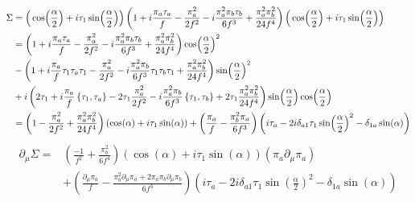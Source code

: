 \documentclass{article}
\begin{document}
\begin{align*}
    \Sigma & =  \Big( \cos(\frac{\alpha}{2}) + i \tau_1 \sin(\frac{\alpha}{2}) \Big) 
    \left(
        1
        + i \frac{\pi_a \tau_a}{f} 
        - \frac{\pi_a^2}{2f^2}
        - i \frac{\pi_a^2\pi_b \tau_b}{6f^3}
        + \frac{\pi_a^2\pi_b^2}{24f^4}    
    \right)
    \Big( \cos(\frac{\alpha}{2}) + i \tau_1 \sin(\frac{\alpha}{2}) \Big) \\
    & =
    \left(
        1
        + i \frac{\pi_a \tau_a}{f} 
        - \frac{\pi_a^2}{2f^2}
        - i \frac{\pi_a^2\pi_b \tau_b}{6f^3}
        + \frac{\pi_a^2\pi_b^2}{24f^4}    
    \right)
    \cos(\frac{\alpha}{2})^2 \\
    & -
    \left(
        1 
        + i \frac{\pi_a}{f} \tau_1\tau_a\tau_1
        - \frac{\pi_a^2}{2f^2}
        - i \frac{\pi_a^2\pi_b}{6f^3} \tau_1\tau_b\tau_1
        + \frac{\pi_a^2\pi_b^2}{24f^4}
    \right)
    \sin(\frac{\alpha}{2})^2\\
    & + i
    \left(
        2 \tau_1
        + i \frac{\pi_a}{f} \left\{\tau_1, \tau_a \right\}
        - 2\tau_1 \frac{\pi_a^2}{2f^2}
        - i \frac{\pi_a^2\pi_b}{6f^3} \left\{\tau_1, \tau_b \right\}
        + 2\tau_1 \frac{\pi_a^2\pi_b^2}{24f^4}
    \right)
    \sin(\frac{\alpha}{2})\cos(\frac{\alpha}{2}) \\
    &= \left(
        1 
        - \frac{\pi_a^2}{2f^2}
        + \frac{\pi_a^2\pi_b^2}{24f^4}
    \right)
    (\cos(\alpha) + i \tau_1 \sin(\alpha))
    + 
    \left(
        \frac{\pi_a}{f} 
        - \frac{\pi_b^2\pi_a}{6f^3} 
    \right)
    \left(
        i\tau_a - 2i \delta_{a1}\tau_1\sin(\frac{\alpha}{2})^2 - \delta_{1a} \sin(\alpha)
    \right)
\end{align*}
\begin{align*}
    \partial_\mu \Sigma = &
    \left(
        \frac{-1}{f^2}
        + \frac{\pi_b^2}{6f^4}
    \right)
    (\cos(\alpha) + i \tau_1 \sin(\alpha)) (\pi_a \partial_\mu \pi_a)\\
    & + 
    \left(
        \frac{\partial_\mu \pi_a}{f} 
        - \frac{\pi_b^2 \partial_\mu\pi_a 
        + 2 \pi_a \pi_b \partial_\mu\pi_b}{6f^3} 
    \right)
    \left(
        i\tau_a - 2i \delta_{a1}\tau_1\sin(\frac{\alpha}{2})^2 - \delta_{1a} \sin(\alpha)
    \right)
\end{align*}
\end{document}
